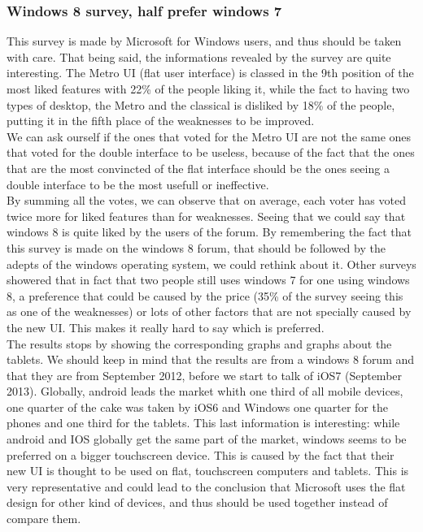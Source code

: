 \documentclass[a4paper,11pt] {article}
\theoremstyle{definition}
\begin{document}
    \subsubsection{Windows 8 survey, half prefer windows 7\cite{windows8Survey}}
This survey is made by Microsoft for Windows users, and thus should be taken with care. That being said, the informations revealed by the survey are quite interesting. The Metro UI (flat user interface) is classed in the 9th position of the most liked features with 22\% of the people liking it, while the fact to having two types of desktop, the Metro and the classical is disliked by 18\% of the people, putting it in the fifth place of the weaknesses to be improved.\\
We can ask ourself if the ones that voted for the Metro UI are not the same ones that voted for the double interface to be useless, because of the fact that the ones that are the most convincted of the flat interface should be the ones seeing a double interface to be the most usefull or ineffective.
\\
By summing all the votes, we can observe that on average, each voter has voted twice more for liked features than for weaknesses. Seeing that we could say that windows 8 is quite liked by the users of the forum. By remembering the fact that this survey is made on the windows 8 forum, that should be followed by the adepts of the windows operating system, we could rethink about it. Other surveys showered that in fact that two people still uses windows 7 for one using windows 8, a preference that could be caused by the price (35\% of the survey seeing this as one of the weaknesses) or lots of other factors that are not specially caused by the new UI. This makes it really hard to say which is preferred.
\\
The results stops by showing the corresponding graphs and graphs about the tablets. We should keep in mind that the results are from a windows 8 forum and that they are from September 2012, before we start to talk of iOS7 (September 2013). Globally, android leads the market whith one third of all mobile devices, one quarter of the cake was taken by iOS6 and Windows one quarter for the phones and one third for the tablets. This last information is interesting: while android and IOS globally get the same part of the market, windows seems to be preferred on a bigger touchscreen device. This is caused by the fact that their new UI is thought to be used on flat, touchscreen computers and tablets. This is very representative and could lead to the conclusion that Microsoft uses the flat design for other kind of devices, and thus should be used together instead of compare them.
\end{document}
